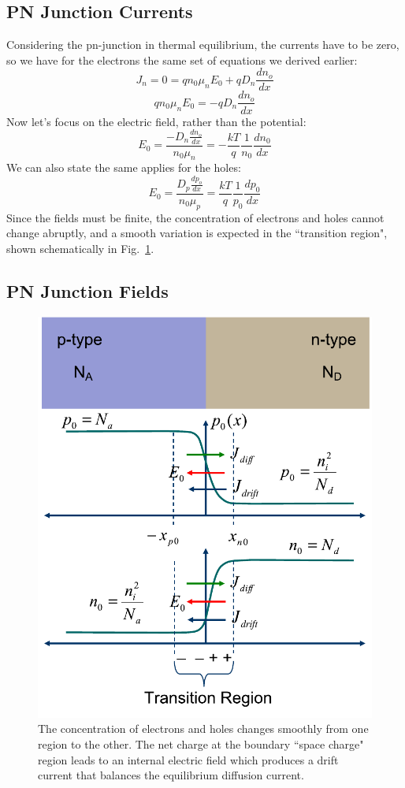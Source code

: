 \subsection{PN Junction Currents}

Considering the pn-junction in thermal equilibrium,  the currents have to be zero, so we have for the electrons the same set of equations we derived earlier:
% 
\begin{equation} 
	{J_n} = 0 = q{n_0}{\mu _n}{E_0} + q{D_n}\frac{{d{n_o}}}{{dx}}
\end{equation}
%
\begin{equation} 
	q{n_0}{\mu _n}{E_0} =  - q{D_n}\frac{{d{n_o}}}{{dx}} 
\end{equation}
%
Now let's focus on the electric field, rather than the potential:
\begin{equation} 
	{E_0} = \frac{{ - {D_n}\frac{{d{n_o}}}{{dx}}}}{{{n_0}{\mu _n}}} =  - \frac{{kT}}{q}\frac{1}{{{n_0}}}\frac{{d{n_0}}}{{dx}} 
\end{equation}
%
We can also state the same applies for the holes:
\begin{equation} 
	{E_0} = \frac{{{D_p}\frac{{d{p_o}}}{{dx}}}}{{{n_0}{\mu _p}}} =   \frac{{kT}}{q}\frac{1}{{{p_0}}}\frac{{d{p_0}}}{{dx}} 
\end{equation}
Since the fields must be finite, the concentration of electrons and holes cannot change abruptly, and a smooth variation is expected in the ``transition region", shown schematically in Fig.~\ref{fig:slide11}.




\subsection{PN Junction Fields}

\begin{figure}[tb]
\begin{center}
\includegraphics[width=.5\columnwidth]{slide11}
\end{center}
\caption{The concentration of electrons and holes changes smoothly from one region to the other.  The net charge at the boundary ``space charge" region leads to an internal electric field which produces a drift current that balances the equilibrium diffusion current.} \label{fig:slide11}
\end{figure}

